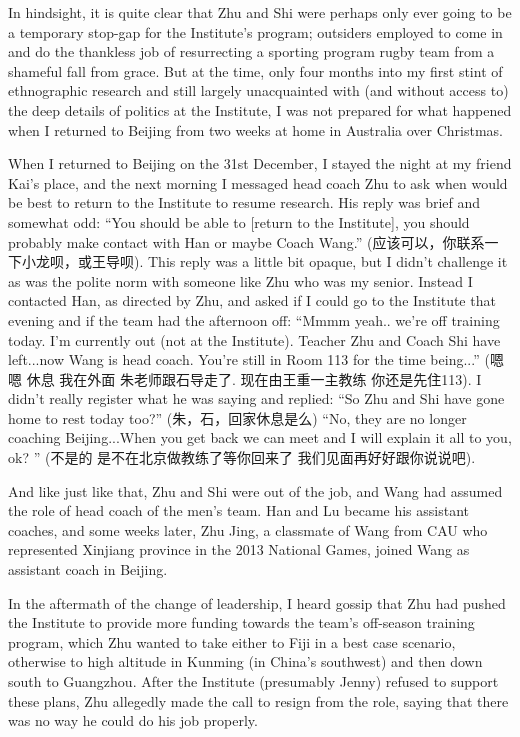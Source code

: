 \begin{CJK}{UTF8}{gbsn}
In hindsight, it is quite clear that Zhu and Shi were perhaps only ever going to be a temporary stop-gap for the Institute's program; outsiders employed to come in and do the thankless job of resurrecting a sporting program rugby team from a shameful fall from grace.  But at the time, only four months into my first stint of ethnographic research and still largely unacquainted with (and without access to) the deep details of politics at the Institute, I was not prepared for what happened when I returned to Beijing from two weeks at home in Australia over Christmas.

When I returned to Beijing on the 31st December, I stayed the night at my friend Kai's place, and the next morning I messaged head coach Zhu to ask when would be best to return to the Institute to resume research.  His reply was brief and somewhat odd: ``You should be able to [return to the Institute], you should probably make contact with Han or maybe Coach Wang.'' (应该可以，你联系一下小龙呗，或王导呗).  This reply was a little bit opaque, but I didn't challenge it as was the polite norm with someone like Zhu who was my senior.  Instead I contacted Han, as directed by Zhu, and asked if I could go to the Institute that evening and if the team had the afternoon off: ``Mmmm yeah.. we're off training today. I'm currently out (not at the Institute). Teacher Zhu and Coach Shi have left...now Wang is head coach.  You're still in Room 113 for the time being...'' (嗯嗯 休息 我在外面 朱老师跟石导走了. 现在由王重一主教练 你还是先住113).  I didn't really register what he was saying and replied:
``So Zhu and Shi have gone home to rest today too?'' (朱，石，回家休息是么)
``No, they are no longer coaching Beijing...When you get back we can meet and I will explain it all to you, ok? '' (不是的 是不在北京做教练了等你回来了 我们见面再好好跟你说说吧).

And like just like that, Zhu and Shi were out of the job, and Wang had assumed the role of head coach of the men's team.  Han and Lu became his assistant coaches, and some weeks later, Zhu Jing, a classmate of Wang from CAU who represented Xinjiang province in the 2013 National Games, joined Wang as assistant coach in Beijing.

In the aftermath of the change of leadership, I heard gossip that Zhu had pushed the Institute to provide more funding towards the team's off-season training program, which Zhu wanted to take either to Fiji in a best case scenario, otherwise to high altitude in Kunming (in China's southwest) and then down south to Guangzhou. After the Institute (presumably Jenny) refused to support these plans, Zhu allegedly made the call to resign from the role, saying that there was no way he could do his job properly.


\end{CJK}
